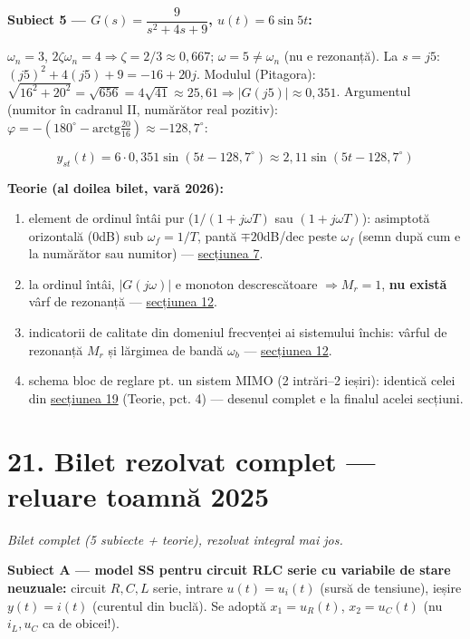\documentclass[10pt,a4paper]{article}
\begin{document}
\textbf{Subiect 5 — $G(s)=\dfrac9{s^2+4s+9}$, $u(t)=6\sin5t$:}

$\omega_n{=}3$, $2\zeta\omega_n{=}4\Rightarrow\zeta{=}2/3{\approx}0{,}667$; $\omega{=}5\ne\omega_n$ (nu e rezonanță). La $s{=}j5$: $(j5)^2{+}4(j5){+}9{=}{-}16{+}20j$. Modulul (Pitagora): $\sqrt{16^2{+}20^2}{=}\sqrt{656}{=}4\sqrt{41}{\approx}25{,}61\Rightarrow|G(j5)|{\approx}0{,}351$. Argumentul (numitor în cadranul II, numărător real pozitiv): $\varphi{=}{-}(180^\circ{-}\mathrm{arctg}\tfrac{20}{16}){\approx}{-}128{,}7^\circ$:
\begin{keyeq}\color{red!65!black}
$$y_{st}(t)=6\cdot0{,}351\sin(5t-128{,}7^\circ)\approx2{,}11\sin(5t-128{,}7^\circ)$$
\end{keyeq}

\begin{keyeq}\color{red!65!black}
\textbf{Teorie (al doilea bilet, vară 2026):}
\begin{enumerate}
\item element de ordinul întâi pur ($1/(1{+}j\omega T)$ sau $(1{+}j\omega T)$): asimptotă orizontală ($0$dB) sub $\omega_f{=}1/T$, pantă $\mp20$dB/dec peste $\omega_f$ (semn după cum e la numărător sau numitor) — \hyperref[sec:7]{secțiunea 7}.
\item la ordinul întâi, $|G(j\omega)|$ e monoton descrescătoare $\Rightarrow M_r{=}1$, \textbf{nu există} vârf de rezonanță — \hyperref[sec:12]{secțiunea 12}.
\item indicatorii de calitate din domeniul frecvenței ai sistemului închis: vârful de rezonanță $M_r$ și lărgimea de bandă $\omega_b$ — \hyperref[sec:12]{secțiunea 12}.
\item schema bloc de reglare pt. un sistem MIMO (2 intrări–2 ieșiri): identică celei din \hyperref[sec:19]{secțiunea 19} (Teorie, pct. 4) — desenul complet e la finalul acelei secțiuni.
\end{enumerate}
\end{keyeq}

\section*{21. Bilet rezolvat complet — reluare toamnă 2025}\label{sec:21}
\textit{Bilet complet (5 subiecte + teorie), rezolvat integral mai jos.}

\textbf{Subiect A — model SS pentru circuit RLC serie cu variabile de stare neuzuale:} circuit $R,C,L$ serie, intrare $u(t){=}u_i(t)$ (sursă de tensiune), ieșire $y(t){=}i(t)$ (curentul din buclă). Se adoptă $x_1{=}u_R(t)$, $x_2{=}u_C(t)$ (nu $i_L,u_C$ ca de obicei!).
\end{document}
